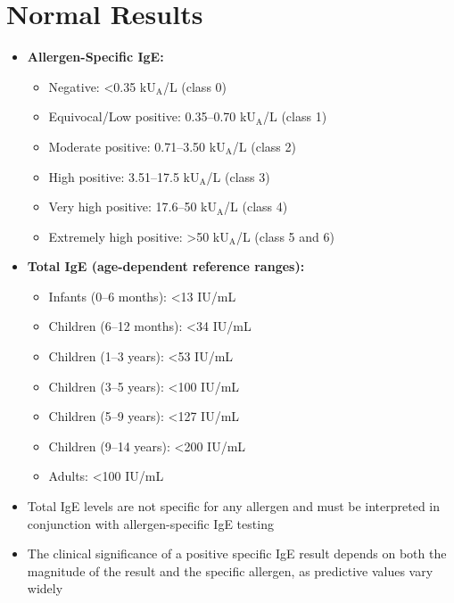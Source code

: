\section*{Normal Results}
\begin{itemize}
  \item \textbf{Allergen-Specific IgE:}
  \begin{itemize}
    \item Negative: <0.35 kU$_\text{A}$/L (class 0)
    \item Equivocal/Low positive: 0.35--0.70 kU$_\text{A}$/L (class 1)
    \item Moderate positive: 0.71--3.50 kU$_\text{A}$/L (class 2)
    \item High positive: 3.51--17.5 kU$_\text{A}$/L (class 3)
    \item Very high positive: 17.6--50 kU$_\text{A}$/L (class 4)
    \item Extremely high positive: >50 kU$_\text{A}$/L (class 5 and 6)
  \end{itemize}
  \item \textbf{Total IgE (age-dependent reference ranges):}
  \begin{itemize}
    \item Infants (0--6 months): <13 IU/mL
    \item Children (6--12 months): <34 IU/mL
    \item Children (1--3 years): <53 IU/mL
    \item Children (3--5 years): <100 IU/mL
    \item Children (5--9 years): <127 IU/mL
    \item Children (9--14 years): <200 IU/mL
    \item Adults: <100 IU/mL
  \end{itemize}
  \item Total IgE levels are not specific for any allergen and must be interpreted in conjunction with allergen-specific IgE testing
  \item The clinical significance of a positive specific IgE result depends on both the magnitude of the result and the specific allergen, as predictive values vary widely
\end{itemize}

